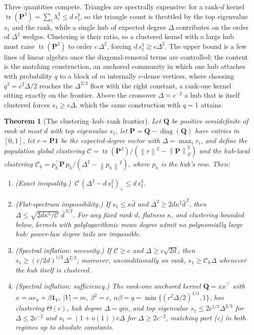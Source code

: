 \documentclass[12pt]{article}
\newtheorem{theorem}{Theorem}
\newcommand{\1}{\mathbf{1}}
\newcommand{\Pmat}{\mathbf{P}}
\newcommand{\bbQ}{\mathbf{Q}}
\newcommand{\norm}[1]{\left\lVert#1\right\rVert}
\newcommand{\abs}[1]{\left\lvert#1\right\rvert}
\DeclareMathOperator{\diag}{diag}
\DeclareMathOperator{\tr}{tr}
\begin{document}
Three quantities compete. Triangles are spectrally expensive: for a rank-$d$ kernel
$\tr(\Pmat^3)=\sum_i\lambda_i^3\le d\,s_1^3$, so the triangle count is throttled by the top eigenvalue $s_1$
and the rank, while a single hub of expected degree $\Delta$ contributes on the order of $\Delta^2$ wedges.
Clustering is their ratio, so a clustered kernel with a large hub must raise $\tr(\Pmat^3)$ to order
$c\,\Delta^2$, forcing $d\,s_1^3\gtrsim c\Delta^2$. The upper bound is a few lines of linear algebra once the
diagonal-removal terms are controlled; the content is the matching construction, an anchored community in
which one hub attaches with probability $q$ to a block of $m$ internally $c$-dense vertices, where choosing
$q^3=c^2\Delta/2$ reaches the $\Delta^{2/3}$ floor with the right constant, a rank-one kernel sitting exactly
on the frontier. Above the crossover $\Delta\asymp c^{-2}$ a hub that is itself clustered forces
$s_1\ge c\Delta$, which the same construction with $q=1$ attains.

\begin{theorem}[The clustering--hub--rank frontier]
\label{thm:frontier}
Let $\bbQ$ be positive semidefinite of rank at most $d$ with top eigenvalue $s_1$, let
$\Pmat=\bbQ-\diag(\bbQ)$ have entries in $[0,1]$, let $r=\Pmat\1$ be the expected-degree vector with
$\Delta=\max_ir_i$, and define the population global clustering
$\mathcal C=\tr(\Pmat^3)/(\norm{r}^2-\norm{\Pmat}_F^2)$ and the hub-local clustering
$\mathcal C_h=p_h^\top\Pmat\,p_h/(\Delta^2-\norm{p_h}^2)$, where $p_h$ is the hub's row. Then:
\begin{enumerate}[label=(\alph*),leftmargin=2em,itemsep=2pt]
\item \emph{(Exact inequality.)} $\ \mathcal C\,(\Delta^2-d\,s_1^2)_+\le d\,s_1^3$.
\item \emph{(Flat-spectrum impossibility.)} If $s_1\le\kappa\bar d$ and $\Delta^2\ge2d\kappa^2\bar
d^{\,2}$, then $\Delta\le\sqrt{2d\kappa^3/\mathcal C}\;\bar d^{\,3/2}$. For any fixed rank $d$,
flatness $\kappa$, and clustering bounded below, kernels with polylogarithmic mean degree admit no
polynomially large hub: power-law degree tails are impossible.
\item \emph{(Spectral inflation: necessity.)} If $\mathcal C\ge c$ and $\Delta\ge c\sqrt{2d}$, then
$s_1\ge(c/2d)^{1/3}\Delta^{2/3}$; moreover, unconditionally on rank, $s_1\ge\mathcal C_h\Delta$
whenever the hub itself is clustered.
\item \emph{(Spectral inflation: sufficiency.)} The rank-one anchored kernel $\bbQ=xx^\top$ with
$x=\alpha e_h+\beta\mathbf 1_V$, $\abs V=m$, $\beta^2=c$, $\alpha\beta=q=\min\{(c^2\Delta/2)^{1/3},1\}$,
has clustering $\Theta(c)$, hub degree $\Delta=qm$, and top eigenvalue $s_1\le2c^{1/3}\Delta^{2/3}$
for $\Delta\le2c^{-2}$ and $s_1=(1+o(1))c\Delta$ for $\Delta\ge2c^{-2}$, matching part (c) in both
regimes up to absolute constants.
\end{enumerate}
\end{theorem}
\end{document}
